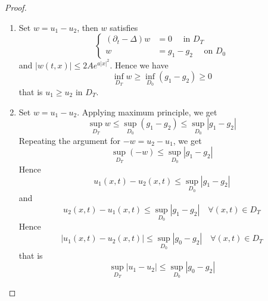 \begin{ProofBox}
    \begin{proof}
        \begin{enumerate}
            \item Set $w = u_1-u_2$, then $w$ satisfies 
            \begin{equation*}
                \begin{cases}
                    (\partial_t - \Delta) w &= 0 \quad \text{ in } D_T\\
                w &= g_1 - g_2 \quad \text{ on } D_0
                \end{cases}
            \end{equation*}
            and $|w(t,x)| \leq 2Ae^{a |x|^2}$. Hence we have
            \begin{equation*}
                \inf_{D_T} w \geq \inf_{D_0}(g_1-g_2) \geq 0
            \end{equation*}
            that is $u_1 \geq u_2$ in $D_T$. 
            \item Set $w = u_1 - u_2$. Applying maximum principle, we get 
            \begin{equation*}
                \sup_{D_T}w \leq \sup_{D_0} (g_1 - g_2) \leq \sup_{D_0} |g_1-g_2|
            \end{equation*}
            Repeating the argument for $-w = u_2 - u_1$, we get 
            \begin{equation*}
                \sup_{D_T}(-w) \leq \sup_{D_0} |g_1-g_2|
            \end{equation*}
            Hence
            \begin{equation*}
                u_1(x,t) - u_2(x,t) \leq \sup_{D_0} |g_1-g_2|
            \end{equation*}
            and
            \begin{equation*}
                u_2(x,t) - u_1(x,t) \leq \sup_{D_0} |g_1-g_2| \quad \forall (x,t) \in D_T
            \end{equation*}
            Hence
            \begin{equation*}
                |u_1(x,t) - u_2(x,t)| \leq \sup_{D_0} |g_0-g_2| \quad \forall (x,t) \in D_T
            \end{equation*}
            that is 
            \begin{equation*}
                \sup_{D_T}|u_1-u_2| \leq \sup_{D_0} |g_0-g_2|
            \end{equation*}
        \end{enumerate}
    \end{proof}
\end{ProofBox}
